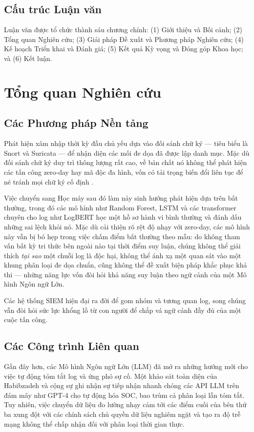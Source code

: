 \documentclass[12pt,a4paper]{article}
\begin{document}
\subsection{Cấu trúc Luận văn}
Luận văn được tổ chức thành sáu chương chính: (1) Giới thiệu và Bối cảnh; (2) Tổng quan Nghiên cứu; (3) Giải pháp Đề xuất và Phương pháp Nghiên cứu; (4) Kế hoạch Triển khai và Đánh giá; (5) Kết quả Kỳ vọng và Đóng góp Khoa học; và (6) Kết luận.

\newpage
\section{Tổng quan Nghiên cứu}

\subsection{Các Phương pháp Nền tảng}
Phát hiện xâm nhập thời kỳ đầu chủ yếu dựa vào đối sánh chữ ký --- tiêu biểu là Snort và Suricata --- để nhận diện các mối đe dọa đã được lập danh mục. Mặc dù đối sánh chữ ký duy trì thông lượng rất cao, về bản chất nó không thể phát hiện các tấn công zero-day hay mã độc đa hình, vốn có tải trọng biến đổi liên tục để né tránh mọi chữ ký cố định \cite{khraisat2019}.

Việc chuyển sang Học máy sau đó làm nảy sinh hướng phát hiện dựa trên bất thường, trong đó các mô hình như Random Forest, LSTM và các transformer chuyên cho log như LogBERT \cite{logbert2021} học một hồ sơ hành vi bình thường và đánh dấu những sai lệch khỏi nó. Mặc dù cải thiện rõ rệt độ nhạy với zero-day, các mô hình này vẫn bị bó hẹp trong việc chấm điểm bất thường theo mẫu: do không tham vấn bất kỳ tri thức bên ngoài nào tại thời điểm suy luận, chúng không thể giải thích \textit{tại sao} một chuỗi log là độc hại, không thể ánh xạ một quan sát vào một khung phân loại đe dọa chuẩn, cũng không thể đề xuất biện pháp khắc phục khả thi --- những năng lực vốn đòi hỏi khả năng suy luận theo ngữ cảnh của một Mô hình Ngôn ngữ Lớn.

Các hệ thống SIEM hiện đại ra đời để gom nhóm và tương quan log, song chúng vẫn đòi hỏi sức lực khổng lồ từ con người để chắp vá ngữ cảnh đầy đủ của một cuộc tấn công.

\subsection{Các Công trình Liên quan}
Gần đây hơn, các Mô hình Ngôn ngữ Lớn (LLM) đã mở ra những hướng mới cho việc tự động tóm tắt log và ứng phó sự cố. Một khảo sát toàn diện của Habibzadeh và cộng sự \cite{habibzadeh2025} ghi nhận sự tiếp nhận nhanh chóng các API LLM trên đám mây như GPT-4 cho tự động hóa SOC, bao trùm cả phân loại lẫn tóm tắt. Tuy nhiên, việc chuyển dữ liệu đo lường nhạy cảm tới các điểm cuối của bên thứ ba xung đột với các chính sách chủ quyền dữ liệu nghiêm ngặt và tạo ra độ trễ mạng không thể chấp nhận đối với phân loại thời gian thực.
\end{document}
